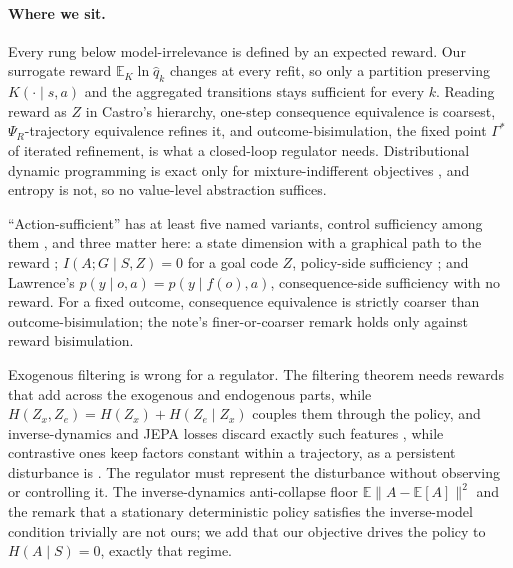 \documentclass[10pt]{article}
\begin{document}
\paragraph{Where we sit.}
Every rung below model-irrelevance is defined by an expected reward. Our surrogate reward $\mathbb{E}_K\ln\hat q_k$ changes at every refit, so only a partition preserving $K(\cdot\mid s,a)$ and the aggregated transitions stays sufficient for every $k$. Reading reward as $Z$ in Castro's hierarchy, one-step consequence equivalence is coarsest, $\Psi_R$-trajectory equivalence refines it, and outcome-bisimulation, the fixed point $\Gamma^*$ of iterated refinement, is what a closed-loop regulator needs. Distributional dynamic programming is exact only for mixture-indifferent objectives \citep{AvilaPires-optimizing25}, and entropy is not, so no value-level abstraction suffices.

``Action-sufficient'' has at least five named variants, control sufficiency among them \citep{Gu-observations25}, and three matter here: a state dimension with a graphical path to the reward \citep{Huang-action22}; $I(A;G\mid S,Z)=0$ for a goal code $Z$, policy-side sufficiency \citep{Hyeon-actionsufficient26}; and Lawrence's $p(y\mid o,a)=p(y\mid f(o),a)$, consequence-side sufficiency with no reward. For a fixed outcome, consequence equivalence is strictly coarser than outcome-bisimulation; the note's finer-or-coarser remark holds only against reward bisimulation.

Exogenous filtering is wrong for a regulator. The filtering theorem needs rewards that add across the exogenous and endogenous parts, while $H(Z_x,Z_e)=H(Z_x)+H(Z_e\mid Z_x)$ couples them through the policy, and inverse-dynamics and JEPA losses discard exactly such features \citep{Pendharkar-predictive26}, while contrastive ones keep factors constant within a trajectory, as a persistent disturbance is \citep{Gulati-contrast26}. The regulator must represent the disturbance without observing or controlling it. The inverse-dynamics anti-collapse floor $\mathbb{E}\|A-\mathbb{E}[A]\|^2$ \citep{Ivashkov-smwm26} and the remark that a stationary deterministic policy satisfies the inverse-model condition trivially \citep{Allen-learning21} are not ours; we add that our objective drives the policy to $H(A\mid S)=0$, exactly that regime.
\end{document}
